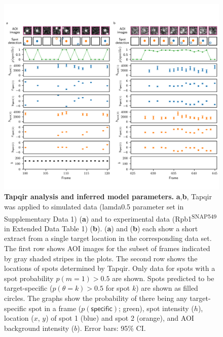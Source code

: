 \begin{figure}[h]
\end{figure}

\begin{figure}[h]
\centering
\includegraphics[width=\textwidth]{figures/figure3.png}
\caption{\textbf{Tapqir analysis and inferred model parameters.} \textbf{a},\textbf{b}, Tapqir was applied to simulated data (lamda0.5 parameter set in Supplementary Data 1) (\textbf{a}) and to experimental data (Rpb1\textsuperscript{SNAP549} in Extended Data Table 1) (\textbf{b}). (\textbf{a}) and (\textbf{b}) each show a short extract from a single target location in the corresponding data set. The first row shows AOI images for the subset of frames indicated by gray shaded stripes in the plots. The second row shows the locations of spots determined by Tapqir. Only data for spots with a spot probability $p(m=1) > 0.5$ are shown. Spots predicted to be target-specific ($p(\theta=k)>0.5$ for spot $k$) are shown as filled circles. The graphs show the probability of there being any target-specific spot in a frame ($p(\mathsf{specific})$; green), spot intensity ($h$), location ($x$, $y$) of spot 1 (blue) and spot 2 (orange), and AOI background intensity ($b$). Error bars: 95\% CI.  }
\label{fig:tapqir_analysis}
\end{figure}

